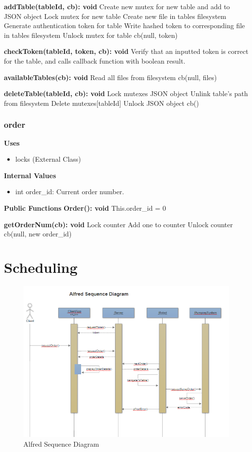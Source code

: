 \documentclass [10pt]{article}
\begin{document}
\textbf{addTable(tableId, cb): void}
Create new mutex for new table and add to JSON object
Lock mutex for new table
Create new file in tables filesystem
Generate authentication token for table
Write hashed token to corresponding file in tables filesystem
Unlock mutex for table
cb(null, token)

\textbf{checkToken(tableId, token, cb): void}
Verify that an inputted token is correct for the table, and calls callback function with boolean result.

\textbf{availableTables(cb): void}
Read all files from filesystem
cb(null, files)

\textbf{deleteTable(tableId, cb): void}
Lock mutexes JSON object
Unlink table's path from filesystem
Delete mutexes[tableId]
Unlock JSON object
cb()

\subsubsection{order}
\textbf{Uses}
\begin{itemize}
	\item locks (External Class)
\end{itemize}

\textbf{Internal Values}
\begin{itemize}
	\item int order\_id: Current order number.
\end{itemize}

\textbf{Public Functions}
\textbf{Order(): void}
This.order\_id = 0

\textbf{getOrderNum(cb): void}
Lock counter
Add one to counter
Unlock counter
cb(null, new order\_id)


\section {Scheduling}

\begin{figure}
	\centering
	\includegraphics [scale = 0.6] {figures/Alfred_SequenceDiagram.png}
	\caption{Alfred Sequence Diagram}
\end{figure}
\end{document}
